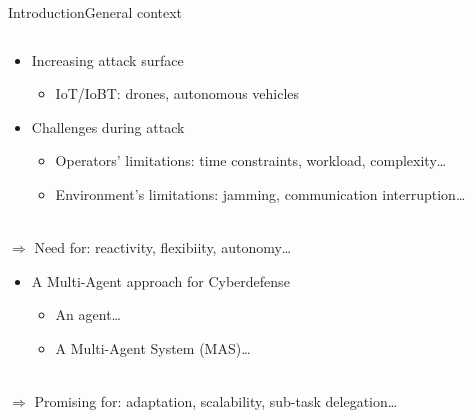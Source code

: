 \begin{frame}{Introduction}{General context}

    \begin{columns}

        \begin{column}{0.7\textwidth}

            \begin{itemize}
                \item Increasing attack surface
                      \begin{itemize}
                          \item IoT/IoBT: drones, autonomous vehicles
                      \end{itemize}
                \item Challenges during attack
                      \begin{itemize}
                          \item Operators' limitations: time constraints, workload, complexity\dots
                          \item Environment's limitations: jamming, communication interruption\dots
                      \end{itemize}
            \end{itemize}

            \ \\

            $\Longrightarrow$ Need for: reactivity, flexibiity, autonomy\dots

            \begin{itemize}
                \item A Multi-Agent approach for Cyberdefense
                      \begin{itemize}
                          \item An agent\dots
                          \item A Multi-Agent System (MAS)\dots
                      \end{itemize}
            \end{itemize}

            \ \\

            $\Longrightarrow$ Promising for: adaptation, scalability, sub-task delegation\dots

        \end{column}

        \begin{column}{0.3\textwidth}

        \end{column}

    \end{columns}

\end{frame}

